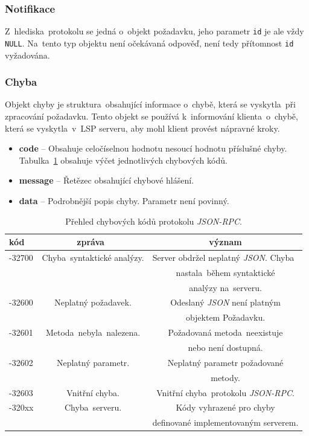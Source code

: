 \subsubsection{Notifikace}
Z~hlediska~protokolu se jedná o~objekt požadavku, jeho parametr \texttt{id} je ale vždy \texttt{NULL}. Na~tento typ objektu není očekávaná odpověď, není tedy přítomnost \texttt{id} vyžadována.

\subsubsection{Chyba}
Objekt chyby je struktura~obsahující informace o~chybě, která se vyskytla~při zpracování požadavku. Tento objekt se používá k~informování klienta~o~chybě, která se vyskytla~v~LSP serveru, aby mohl klient provést nápravné kroky.

\begin{itemize}
    \item{\textbf{code} -- Obsahuje celočíselnou hodnotu nesoucí hodnotu příslušné chyby. Tabulka~\ref{jsonrpcerrorcodes} obsahuje výčet jednotlivých chybových kódů.}
    \item{\textbf{message} -- Řetězec obsahující chybové hlášení.}
    \item{\textbf{data} -- Podrobnější popis chyby. Parametr není povinný.}
\end{itemize}

\begin{table}[hbt]
\centering
\begin{tabular}{|l|c|c|}
\hline
kód & zpráva~& význam \\\hline
-32700 & Chyba~syntaktické analýzy. & Server obdržel neplatný \emph{JSON}. Chyba~ \\ 
& & nastala~během syntaktické \\ 
& & analýzy na~serveru. \\\hline
-32600 & Neplatný požadavek.  & Odeslaný \emph{JSON} není platným \\ 
& & objektem  Požadavku.\\\hline
-32601 & Metoda~nebyla~nalezena. & Požadovaná metoda~neexistuje \\
& & nebo není dostupná. \\\hline
-32602 & Neplatný parametr.  & Neplatný parametr požadované \\
& & metody. \\\hline
-32603 & Vnitřní chyba. & Vnitřní chyba~protokolu \emph{JSON-RPC}. \\\hline
-320xx & Chyba~serveru. & Kódy vyhrazené pro chyby \\
& & definované implementovaným serverem.\\\hline
\end{tabular}
\caption{\label{tab:chyboveKodyJson}Přehled chybových kódů protokolu \emph{JSON-RPC}.}
\label{jsonrpcerrorcodes}
\end{table}

